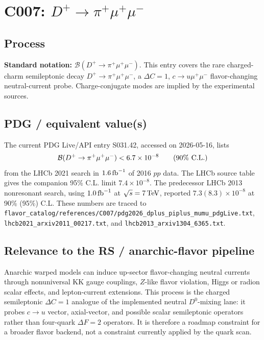 
\section{C007: \(D^+\to\pi^+\mu^+\mu^-\)}

\subsection*{Process}
\textbf{Standard notation:}
\(\mathcal{B}(D^+\to\pi^+\mu^+\mu^-)\).
This entry covers the rare charged-charm semileptonic decay
\(D^+\to\pi^+\mu^+\mu^-\), a \(\Delta C=1\), \(c\to u\mu^+\mu^-\)
flavor-changing neutral-current probe.  Charge-conjugate modes are implied by
the experimental sources.

\subsection*{PDG / equivalent value(s)}
The current PDG Live/API entry S031.42, accessed on 2026-05-16, lists
\[
  \mathcal{B}(D^+\to\pi^+\mu^+\mu^-) < 6.7\times 10^{-8}
  \qquad (90\%~{\rm C.L.})
\]
from the LHCb 2021 search in \(1.6\,{\rm fb}^{-1}\) of 2016 \(pp\) data.
The LHCb source table gives the companion 95\% C.L. limit
\(7.4\times10^{-8}\).  The predecessor LHCb 2013 nonresonant search, using
\(1.0\,{\rm fb}^{-1}\) at \(\sqrt{s}=7\,{\rm TeV}\), reported
\(7.3(8.3)\times10^{-8}\) at 90\% (95\%) C.L.  These numbers are traced to
\texttt{flavor\_catalog/references/C007/pdg2026\_dplus\_piplus\_mumu\_pdgLive.txt},
\texttt{lhcb2021\_arxiv2011\_00217.txt}, and
\texttt{lhcb2013\_arxiv1304\_6365.txt}.

\subsection*{Relevance to the RS / anarchic-flavor pipeline}
Anarchic warped models can induce up-sector flavor-changing neutral currents
through nonuniversal KK gauge couplings, \(Z\)-like flavor violation, Higgs or
radion scalar effects, and lepton-current extensions.  This process is the
charged semileptonic \(\Delta C=1\) analogue of the implemented neutral
\(D^0\)-mixing lane: it probes \(c\to u\) vector, axial-vector, and possible
scalar semileptonic operators rather than four-quark \(\Delta F=2\) operators.
It is therefore a roadmap constraint for a broader flavor backend, not a
constraint currently applied by the quark scan.

